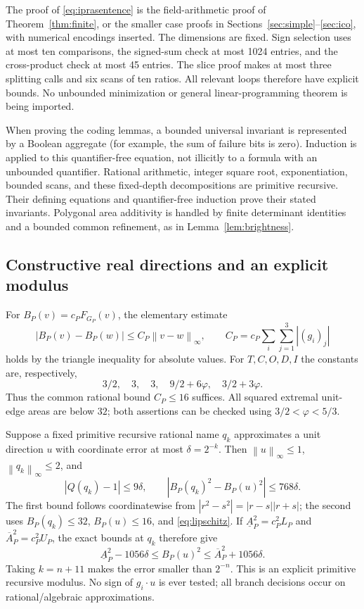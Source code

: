 \documentclass[11pt,a4paper]{article}
\newcommand{\ph}{\varphi}
\newcommand{\norm}[1]{\left\lVert#1\right\rVert}
\newcommand{\abs}[1]{\left|#1\right|}
\begin{document}
The proof of \eqref{eq:iprasentence} is the field-arithmetic proof of Theorem~\ref{thm:finite}, or the smaller case proofs in Sections~\ref{sec:simple}--\ref{sec:ico}, with numerical encodings inserted. The dimensions are fixed. Sign selection uses at most ten comparisons, the signed-sum check at most 1024 entries, and the cross-product check at most 45 entries. The slice proof makes at most three splitting calls and six scans of ten ratios. All relevant loops therefore have explicit bounds. No unbounded minimization or general linear-programming theorem is being imported.

When proving the coding lemmas, a bounded universal invariant is represented by a Boolean aggregate (for example, the sum of failure bits is zero). Induction is applied to this quantifier-free equation, not illicitly to a formula with an unbounded quantifier. Rational arithmetic, integer square root, exponentiation, bounded scans, and these fixed-depth decompositions are primitive recursive. Their defining equations and quantifier-free induction prove their stated invariants. Polygonal area additivity is handled by finite determinant identities and a bounded common refinement, as in Lemma~\ref{lem:brightness}.

\subsection{Constructive real directions and an explicit modulus}
For $B_P(v)=c_PF_{G_P}(v)$, the elementary estimate
\begin{equation}\label{eq:lipschitz}
 \abs{B_P(v)-B_P(w)}\le C_P\norm{v-w}_\infty,\qquad
 C_P=c_P\sum_i\sum_{j=1}^3\abs{(g_i)_j}
\end{equation}
holds by the triangle inequality for absolute values. For $T,C,O,D,I$ the constants are, respectively,
\[
 3/2,\quad3,\quad3,\quad9/2+6\ph,\quad3/2+3\ph.
\]
Thus the common rational bound $C_P\le16$ suffices. All squared extremal unit-edge areas are below $32$; both assertions can be checked using $3/2<\ph<5/3$.

Suppose a fixed primitive recursive rational name $q_k$ approximates a unit direction $u$ with coordinate error at most $\delta=2^{-k}$. Then $\norm u_\infty\le1$, $\norm{q_k}_\infty\le2$, and
\[
 \abs{Q(q_k)-1}\le9\delta,\qquad
 \abs{B_P(q_k)^2-B_P(u)^2}\le768\delta.
\]
The first bound follows coordinatewise from $\abs{r^2-s^2}=\abs{r-s}\abs{r+s}$; the second uses $B_P(q_k)\le32$, $B_P(u)\le16$, and \eqref{eq:lipschitz}. If $\underline A_P^2=c_P^2L_P$ and $\overline A_P^2=c_P^2U_P$, the exact bounds at $q_k$ therefore give
\[
 \underline A_P^2-1056\delta
 \le B_P(u)^2\le
 \overline A_P^2+1056\delta.
\]
Taking $k=n+11$ makes the error smaller than $2^{-n}$. This is an explicit primitive recursive modulus. No sign of $g_i\cdot u$ is ever tested; all branch decisions occur on rational/algebraic approximations.
\end{document}
